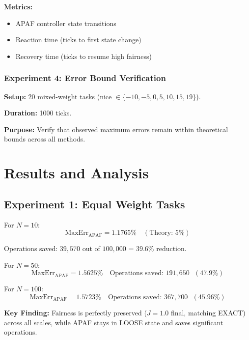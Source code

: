 \documentclass[conference]{IEEEtran}
\begin{document}
\textbf{Metrics:}
\begin{itemize}
\item APAF controller state transitions
\item Reaction time (ticks to first state change)
\item Recovery time (ticks to resume high fairness)
\end{itemize}

\subsubsection{Experiment 4: Error Bound Verification}

\textbf{Setup:} 20 mixed-weight tasks (nice $\in \{-10, -5, 0, 5, 10, 15, 19\}$).

\textbf{Duration:} 1000 ticks.

\textbf{Purpose:} Verify that observed maximum errors remain within theoretical bounds across all methods.

\section{Results and Analysis}\label{sec:results}

\subsection{Experiment 1: Equal Weight Tasks}

For $N=10$:
\begin{equation}
\text{MaxErr}_{\text{APAF}} = 1.1765\% \quad (\text{Theory: } 5\%)
\end{equation}

Operations saved: $39{,}570$ out of $100{,}000$ = $39.6\%$ reduction.

For $N=50$:
\begin{equation}
\text{MaxErr}_{\text{APAF}} = 1.5625\% \quad \text{Operations saved: } 191{,}650 \text{ } (47.9\%)
\end{equation}

For $N=100$:
\begin{equation}
\text{MaxErr}_{\text{APAF}} = 1.5723\% \quad \text{Operations saved: } 367{,}700 \text{ } (45.96\%)
\end{equation}

\textbf{Key Finding:} Fairness is perfectly preserved ($J = 1.0$ final, matching EXACT) across all scales, while APAF stays in LOOSE state and saves significant operations.
\end{document}

